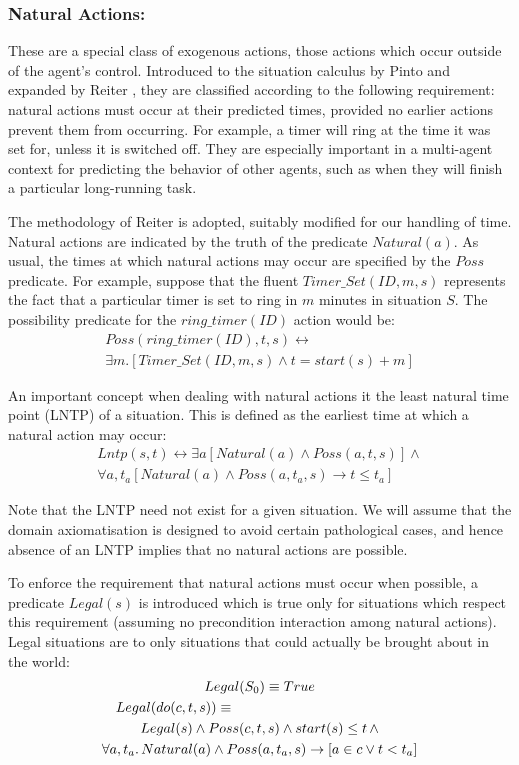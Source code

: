 \documentclass{llncs}
\begin{document}
\subsubsection{Natural Actions:}
These are a special class of exogenous actions, those
actions which occur outside of the agent's control.
Introduced to the situation
calculus by Pinto \cite{pinto94temporal} and expanded by Reiter \cite{reiter96sc_nat_conc},
they are classified according to the following requirement: natural
actions must occur at their predicted times, provided no earlier actions
prevent them from occurring. For example, a timer will ring at the
time it was set for, unless it is switched off.
They are especially important in a multi-agent context for predicting the
behavior of other agents, such as when they will finish a particular
long-running task.

The methodology of Reiter is adopted, suitably
modified for our handling of time. Natural actions are indicated by the
truth of the predicate $Natural(a)$. As usual, the times at which
natural actions may occur are specified by the $Poss$ predicate.
For example, suppose that the fluent $Timer\_Set(ID,m,s)$ represents
the fact that a particular timer is set to ring in $m$ minutes in
situation $S$. The possibility predicate for the $ring\_timer(ID)$
action would be:
\begin{multline}
Poss(ring\_timer(ID),t,s)\leftrightarrow\\
\exists m.\left[Timer\_Set(ID,m,s)\wedge t=start(s)+m\right]
\end{multline}

An important concept when dealing with natural actions it the least
natural time point (LNTP) of a situation. This is defined as the earliest
time at which a natural action may occur:
\begin{multline}
\label{eqn:lntp_def}
Lntp(s,t)\leftrightarrow \exists a\left[Natural(a)\wedge Poss(a,t,s)\right]\wedge\\
\forall a,t_{a}\left[Natural(a)\wedge Poss(a,t_{a},s)\rightarrow t\leq t_{a}\right]
\end{multline}

Note that the LNTP need not exist for a given situation.
We will assume that the domain axiomatisation
is designed to avoid certain pathological cases, and hence absence of an
LNTP implies that no natural actions are possible.

To enforce the requirement that natural actions must occur when possible,
a predicate $Legal(s)$ is introduced which is true only for situations
which respect this requirement (assuming no precondition interaction
among natural actions).  Legal situations are to only situations that could
actually be brought about in the world:
\begin{multline}
\label{eqn:legal_def}
Legal(S_0) \equiv True\\
\shoveleft{Legal(do(c,t,s)) \equiv}\\
Legal(s)\wedge Poss(c,t,s)\wedge start(s)\leq t \, \wedge\\
\forall a,t_{a}.\,Natural(a)\wedge Poss(a,t_{a},s)\rightarrow\left[a\in c\vee t<t_{a}\right]
\end{multline}
\end{document}
